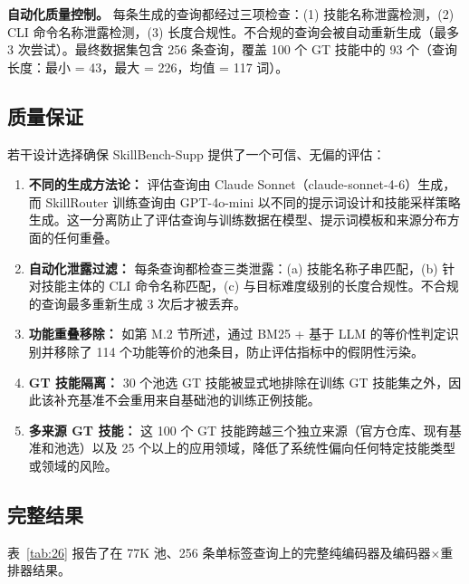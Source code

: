 \documentclass[11pt,UTF8,fontset=fandol]{ctexart}
\begin{document}
\textbf{自动化质量控制。} 每条生成的查询都经过三项检查：(1) 技能名称泄露检测，(2) CLI 命令名称泄露检测，(3) 长度合规性。不合规的查询会被自动重新生成（最多 3 次尝试）。最终数据集包含 256 条查询，覆盖 100 个 GT 技能中的 93 个（查询长度：最小 = 43，最大 = 226，均值 = 117 词）。

\subsection{质量保证}

若干设计选择确保 SkillBench-Supp 提供了一个可信、无偏的评估：

\begin{enumerate}[leftmargin=2em]
\item \textbf{不同的生成方法论：} 评估查询由 Claude Sonnet（claude-sonnet-4-6）生成，而 SkillRouter 训练查询由 GPT-4o-mini 以不同的提示词设计和技能采样策略生成。这一分离防止了评估查询与训练数据在模型、提示词模板和来源分布方面的任何重叠。
\item \textbf{自动化泄露过滤：} 每条查询都检查三类泄露：(a) 技能名称子串匹配，(b) 针对技能主体的 CLI 命令名称匹配，(c) 与目标难度级别的长度合规性。不合规的查询最多重新生成 3 次后才被丢弃。
\item \textbf{功能重叠移除：} 如第 M.2 节所述，通过 BM25 + 基于 LLM 的等价性判定识别并移除了 114 个功能等价的池条目，防止评估指标中的假阴性污染。
\item \textbf{GT 技能隔离：} 30 个池选 GT 技能被显式地排除在训练 GT 技能集之外，因此该补充基准不会重用来自基础池的训练正例技能。
\item \textbf{多来源 GT 技能：} 这 100 个 GT 技能跨越三个独立来源（官方仓库、现有基准和池选）以及 25 个以上的应用领域，降低了系统性偏向任何特定技能类型或领域的风险。
\end{enumerate}

\subsection{完整结果}

表~\ref{tab:26} 报告了在 77K 池、256 条单标签查询上的完整纯编码器及编码器$\times$重排器结果。
\end{document}

